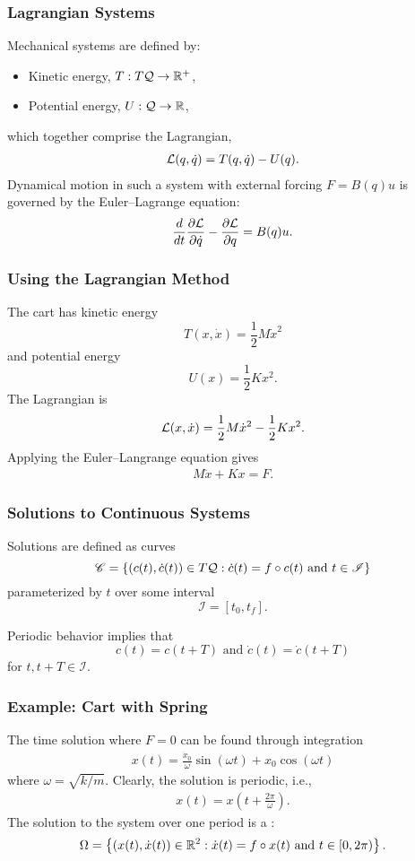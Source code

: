 \begin{frame}
  \frametitle{Lagrangian Systems}
  Mechanical systems are defined by:
  \begin{itemize}
  \item Kinetic energy, $T : T\mathcal{Q} \to \mathbb{R}^+$,
  \item Potential energy, $U : \mathcal{Q} \to \mathbb{R}$,
  \end{itemize}
  which together comprise the Lagrangian,
  \begin{align*}
    \mathcal{L}(q, \dot q) = T(q, \dot q) - U(q).
  \end{align*}
  Dynamical motion in such a system with external forcing $F = B(q) u$ is governed by the Euler--Lagrange equation:
  \begin{align*}
    \frac{d}{dt} \frac{\partial{\ensuremath{\mathcal{L}}}}{\partial{\ensuremath{\dot q}}} - \frac{\partial{\ensuremath{\mathcal{L}}}}{\partial{\ensuremath{q}}} = B(q) u.
  \end{align*}
\end{frame}

\begin{frame}
  \frametitle{Using the Lagrangian Method}
  The cart has kinetic energy $$T(x, {\dot x}) = \frac{1}{2} M {\dot x}^2$$ and potential energy $$U(x) = \frac{1}{2} K x^{2}.$$
  The Lagrangian is
  \begin{align*}
    \mathcal{L}(x, {\dot x}) = \frac{1}{2} M {\dot x}^2 - \frac{1}{2} K x^{2}.
  \end{align*}
  Applying the Euler--Langrange equation gives
  \begin{align*}
    M {\ddot x} + K x = F.
  \end{align*}
\end{frame}

\begin{frame}
  \frametitle{Solutions to Continuous Systems}
  Solutions are defined as curves $$\mathscr{C} = \left\{ (c(t), {\dot c(t)}) \in T\mathcal{Q} : \dot c(t) = f \circ c(t) \mbox{ and } t \in \mathscr{I} \right\}$$ parameterized by $t$ over some interval $$\mathscr{I} = [t_0, t_f].$$

  Periodic behavior implies that $$c(t) = c(t + T) \mbox{ and } {\dot c}(t) = {\dot c}(t + T)$$ for $t, t + T \in \mathscr{I}$.
\end{frame}

\begin{frame}
  \frametitle{Example: Cart with Spring}
  The time solution where $F = 0$ can be found through integration
  \begin{align*}
    x(t) = \frac{{\dot x_{0}}}{\omega} \sin (\omega t) + x_{0} \cos (\omega t)
  \end{align*}
  where $\omega = \sqrt{k/m}$. Clearly, the solution is periodic, i.e.,
  \begin{align*}
    x(t) = x\left(t + \frac{2\pi}{\omega}\right).
  \end{align*}
  The solution to the system over one period is a :
  \begin{align*}
    \Omega = \left\{(x(t), \dot x(t)) \in \mathbb{R}^{2} : \dot x(t) = f \circ x(t) \mbox { and } t \in [0, 2\pi)\right\}.
  \end{align*}
\end{frame}

